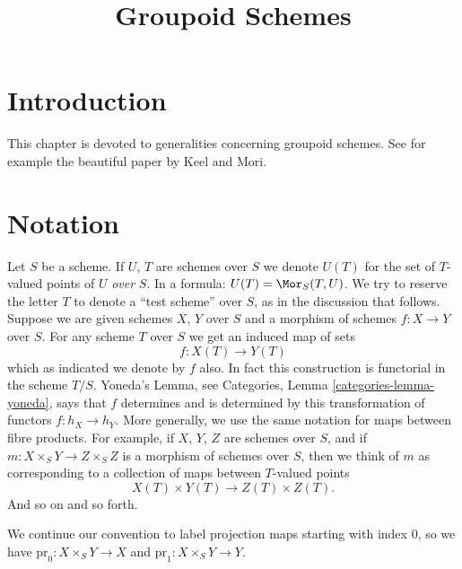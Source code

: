 

%


\title{Groupoid Schemes}


\maketitle

\label{section-phantom}

\tableofcontents

\section{Introduction}
\label{section-introduction}

\noindent
This chapter is devoted to generalities concerning groupoid schemes.
See for example the beautiful paper \cite{K-M} by Keel and Mori.





\section{Notation}
\label{section-notation}

\noindent
Let $S$ be a scheme. If $U$, $T$ are schemes over $S$ we denote
$U(T)$ for the set of $T$-valued points of $U$ {\it over} $S$. In a formula:
$U(T) = \Mor_S(T, U)$. We try to reserve the letter $T$ to denote
a ``test scheme'' over $S$, as in the discussion that follows.
Suppose we are given schemes $X$, $Y$ over
$S$ and a morphism of schemes $f : X \to Y$ over $S$.
For any scheme $T$ over $S$ we get an induced map of sets
$$
f : X(T) \longrightarrow Y(T)
$$
which as indicated we denote by $f$ also. In fact this construction
is functorial in the scheme $T/S$. Yoneda's Lemma, see Categories,
Lemma \ref{categories-lemma-yoneda}, says that $f$ determines and is
determined by this transformation of functors $f : h_X \to h_Y$.
More generally, we use the same notation for maps between fibre
products. For example, if
$X$, $Y$, $Z$ are schemes over $S$, and if
$m : X \times_S Y \to Z \times_S Z$ is
a morphism of schemes over $S$, then we think of $m$ as corresponding
to a collection of maps between $T$-valued points
$$
X(T) \times Y(T) \longrightarrow Z(T) \times Z(T).
$$
And so on and so forth.

\medskip\noindent
We continue our convention to label projection maps starting with
index $0$, so we have $\text{pr}_0 : X \times_S Y \to X$ and
$\text{pr}_1 : X \times_S Y \to Y$.







